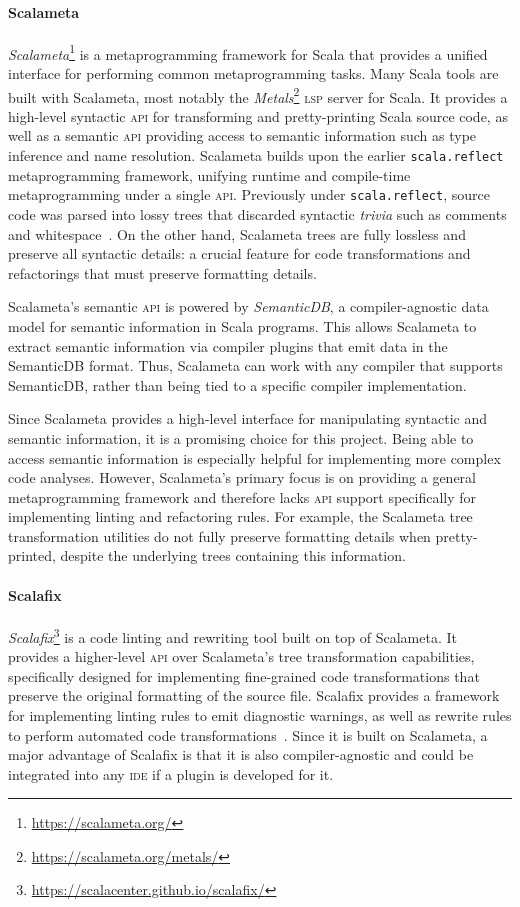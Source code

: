 \documentclass[../../main.tex]{subfiles}
\begin{document}
\paragraph{Scalameta}
\textit{Scalameta}\footnote{\url{https://scalameta.org/}} is a metaprogramming framework for Scala that provides a unified interface for performing common metaprogramming tasks.
Many Scala tools are built with Scalameta, most notably the \emph{Metals}\footnote{\url{https://scalameta.org/metals/}} \textsc{lsp} server for Scala.
It provides a high-level syntactic \textsc{api} for transforming and pretty-printing Scala source code, as well as a semantic \textsc{api} providing access to semantic information such as type inference and name resolution.
Scalameta builds upon the earlier \texttt{scala.reflect} metaprogramming framework, unifying runtime and compile-time metaprogramming under a single \textsc{api}.
Previously under \texttt{scala.reflect}, source code was parsed into lossy trees that discarded syntactic \emph{trivia} such as comments and whitespace~\cite{burmako_scalameta_2017}.
On the other hand, Scalameta trees are fully lossless and preserve all syntactic details: a crucial feature for code transformations and refactorings that must preserve formatting details.

Scalameta's semantic \textsc{api} is powered by \textit{SemanticDB}, a compiler-agnostic data model for semantic information in Scala programs.
This allows Scalameta to extract semantic information via compiler plugins that emit data in the SemanticDB format.
Thus, Scalameta can work with any compiler that supports SemanticDB, rather than being tied to a specific compiler implementation.

Since Scalameta provides a high-level interface for manipulating syntactic and semantic information, it is a promising choice for this project.
Being able to access semantic information is especially helpful for implementing more complex code analyses.
However, Scalameta's primary focus is on providing a general metaprogramming framework and therefore lacks \textsc{api} support specifically for implementing linting and refactoring rules.
For example, the Scalameta tree transformation utilities do not fully preserve formatting details when pretty-printed, despite the underlying trees containing this information.

\paragraph{Scalafix}
\textit{Scalafix}\footnote{\url{https://scalacenter.github.io/scalafix/}} is a code linting and rewriting tool built on top of Scalameta.
It provides a higher-level \textsc{api} over Scalameta's tree transformation capabilities, specifically designed for implementing fine-grained code transformations that preserve the original formatting of the source file.
Scalafix provides a framework for implementing linting rules to emit diagnostic warnings, as well as rewrite rules to perform automated code transformations~\cite{geirsson_catch_2017}.
Since it is built on Scalameta, a major advantage of Scalafix is that it is also compiler-agnostic and could be integrated into any \textsc{ide} if a plugin is developed for it.
\end{document}
